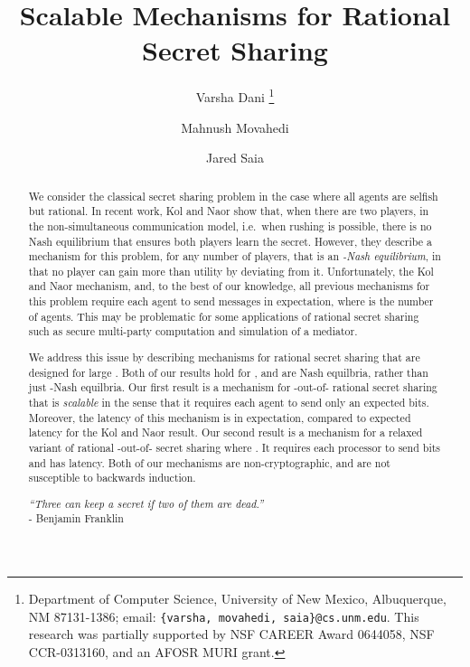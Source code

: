 \documentclass[12pt]{article}
\theoremstyle{definition}
\begin{document}
\title{Scalable Mechanisms for Rational Secret Sharing}

\author{Varsha Dani \thanks{Department of Computer Science,  
University of New Mexico,  Albuquerque,  NM 87131-1386;
email: {\tt \{varsha, movahedi, saia\}@cs.unm.edu}. 
This research was partially supported by NSF CAREER Award 0644058,
NSF CCR-0313160, and an AFOSR MURI grant.} 
\and Mahnush Movahedi \footnotemark[1] \and Jared Saia \footnotemark[1]}

\date{}

\maketitle
\begin{abstract}

We consider the classical secret sharing problem in the case where all
agents are selfish but rational. In recent work, Kol and Naor show
that, when there are two players, in the non-simultaneous communication model, i.e.\ when rushing is
possible, there is no Nash equilibrium that ensures both players learn
the secret.  However, they describe a mechanism for this problem, for any number of players, that
is an \emph{-Nash equilibrium}, in that no player can gain more than 
utility by deviating from it. Unfortunately, the Kol and Naor
mechanism, and, to the best of our knowledge, all previous mechanisms
for this problem require each agent to send  messages in
expectation, where  is the number of agents.  This may be
problematic for some applications of rational secret sharing such as
secure multi-party computation and simulation of a mediator.

We address this issue by describing mechanisms for rational
 secret sharing that are designed for large .  Both of our results hold for , and are Nash equilbria, rather than just -Nash equilbria.
 Our first result is a mechanism for -out-of- rational secret sharing that is \emph{scalable} in the sense that it requires each agent to
send only an expected  bits.  Moreover, the latency of this
mechanism is  in expectation, compared to  expected
latency for the Kol and Naor result.  Our second result is a mechanism for a
relaxed variant of rational -out-of- secret sharing where .  It requires each processor to send  bits and
has  latency.  Both of our mechanisms are non-cryptographic, and
are not susceptible to backwards induction.
\begin{flushright}
\emph{``Three can keep a secret if two of them are dead.''}\\ -
Benjamin Franklin
\end{flushright}
\end{abstract}
\end{document}
